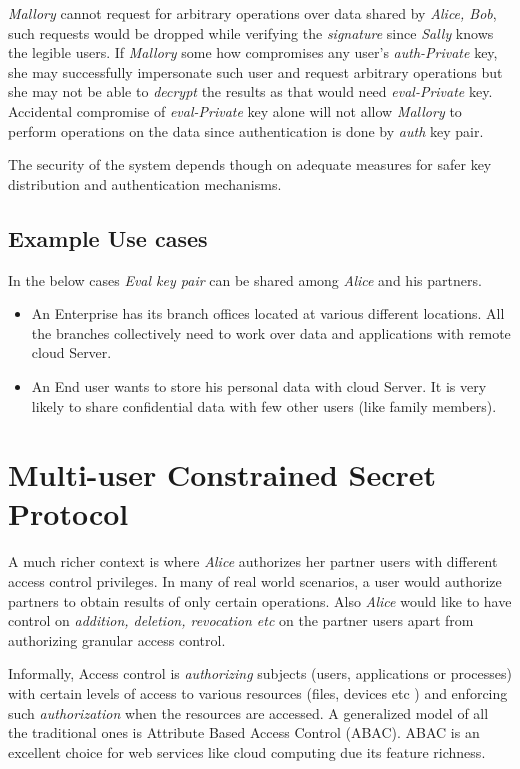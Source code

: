 \documentclass[conference]{IEEEtran}
\numberwithin{equation}{section}
\begin{document}
 \emph{Mallory} cannot request for arbitrary operations over data shared by \emph{Alice, Bob}, such requests would be dropped while verifying the \emph{signature} since \emph{Sally} knows the legible users. If \emph{Mallory} some how compromises any user's \emph{auth-Private} key, she may successfully impersonate such user and request arbitrary operations but she may not be able to \emph{decrypt} the results as that would need \emph{eval-Private} key. Accidental compromise of  \emph{eval-Private} key alone will not allow \emph{Mallory} to perform operations on the data since authentication is done by \emph{auth} key pair.

The security of the system depends though on adequate measures for safer key distribution and authentication mechanisms.
 
\subsection{Example Use cases}

In the below cases \emph{Eval  key pair} can be shared among \emph{Alice} and his partners.
\begin{itemize}
\item An Enterprise has its branch offices located at various different locations. All the branches collectively need to work over data and applications with remote cloud Server.
\item An End user wants to store his personal data with cloud Server. It is very likely to share confidential data with few other users (like family members).
\end{itemize}

\section{Multi-user Constrained Secret Protocol}

A much richer context is where \emph{Alice} authorizes her partner users with different access control privileges. In many of real world scenarios, a user would authorize partners to obtain results of only certain operations. Also \emph{Alice} would like to have control on \emph{addition, deletion, revocation etc } on the partner users apart from authorizing granular access control.

Informally, Access control is \emph{authorizing}  subjects (users, applications or processes) with certain levels of access to various resources (files, devices etc ) and enforcing such \emph{authorization} when the resources are accessed. A generalized model of all the traditional ones is Attribute Based Access Control (ABAC)\cite{jin2012unified}. ABAC is an excellent choice for web services like cloud computing due its feature richness\cite{yuan2005abac}.
\end{document}
